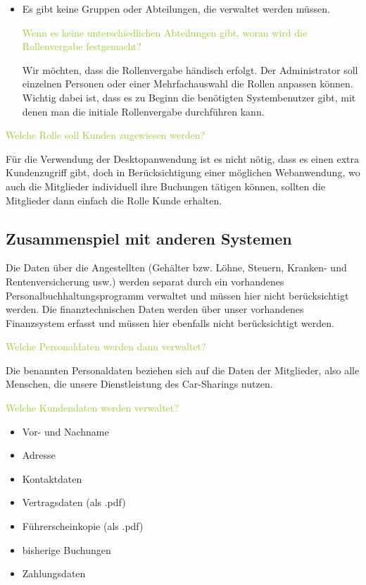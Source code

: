 \begin{itemize}
    \item Es gibt keine Gruppen oder Abteilungen, die verwaltet werden müssen.
    
    \textcolor{YellowGreen}{Wenn es keine unterschiedlichen Abteilungen gibt, woran wird die Rollenvergabe festgemacht?}

    \textcolor{NavyBlue}{Wir möchten, dass die Rollenvergabe händisch erfolgt. Der Administrator soll einzelnen Personen oder einer Mehrfachauswahl die Rollen anpassen können. Wichtig dabei ist, dass es zu Beginn die benötigten Systembenutzer gibt, mit denen man die initiale Rollenvergabe durchführen kann.}

\end{itemize}

\textcolor{YellowGreen}{Welche Rolle soll Kunden zugewiesen werden?}

\textcolor{NavyBlue}{Für die Verwendung der Desktopanwendung ist es nicht nötig, dass es einen extra Kundenzugriff gibt, doch in Berücksichtigung einer möglichen Webanwendung, wo auch die Mitglieder individuell ihre Buchungen tätigen können, sollten die Mitglieder dann einfach die Rolle Kunde erhalten.}

\subsection{Zusammenspiel mit anderen Systemen}

Die Daten über die Angestellten (Gehälter bzw. Löhne, Steuern, Kranken- und Rentenversicherung usw.) werden separat durch ein vorhandenes Personalbuchhaltungsprogramm verwaltet und müssen hier nicht berücksichtigt werden. Die finanztechnischen Daten werden über unser vorhandenes Finanzsystem erfasst und müssen hier ebenfalls nicht berücksichtigt werden. 

\textcolor{YellowGreen}{Welche Personaldaten werden dann verwaltet?}

\textcolor{NavyBlue}{Die benannten Personaldaten beziehen sich auf die Daten der Mitglieder, also alle Menschen, die unsere Dienstleistung des Car-Sharings nutzen.}

\textcolor{YellowGreen}{Welche Kundendaten werden verwaltet?}

\textcolor{NavyBlue}{
    \begin{itemize}
        \item Vor- und Nachname
        \item Adresse
        \item Kontaktdaten
        \item Vertragsdaten (als .pdf)
        \item Führerscheinkopie (als .pdf)
        \item bisherige Buchungen
        \item Zahlungsdaten
    \end{itemize}
}

